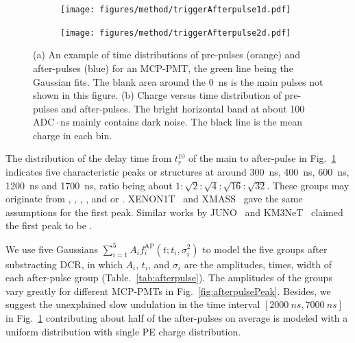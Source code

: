 \begin{figure}[!htbp]
    \centering
    \begin{subfigure}[t]{\LF\textwidth}
        \texttt{[image: figures/method/triggerAfterpulse1d.pdf]}
        \caption{}%
        \label{fig:afterpulse1d}
    \end{subfigure}
    \begin{subfigure}[t]{\LF\textwidth}
        \texttt{[image: figures/method/triggerAfterpulse2d.pdf]}
        \caption{}
        \label{fig:afterpulse2d}
    \end{subfigure}
    \caption{(a) An example of time distributions of pre-pulses (orange) and after-pulses (blue) for an MCP-PMT, the green line being the Gaussian fits. The blank area around the \SI{0}{ns} is the main pulses not shown in this figure. (b) Charge versus time distribution of pre-pulses and after-pulses. The bright horizontal band at about 100\,$\mathrm{ADC}\cdot \mathrm{ns}$ mainly contains dark noise. The black line is the mean charge in each bin.}
\end{figure}

The distribution of the delay time from $t_r^{10}$ of the main to after-pulse in Fig.~\ref{fig:afterpulse1d} indicates five characteristic peaks or structures at around \SI{300}{ns}, \SI{400}{ns}, \SI{600}{ns}, \SI{1200}{ns} and \SI{1700}{ns}, ratio being about $1:\sqrt{2}:\sqrt{4}:\sqrt{16}:\sqrt{32}$. These groups may originate from , , , , and  or . XENON1T~\cite{XENON1TTesting} and XMASS~\cite{Abe_2020} gave the same assumptions for the first peak. Similar works by JUNO~\cite{Zhao:2022gks} and KM3NeT~\cite{KM3NetTesting} claimed the first peak to be .

We use five Gaussians $\sum_{i=1}^{5}{A_if_i^{\mathrm{AP}}(t;t_i,\sigma_i^2)}$ to model the five groups after substracting DCR, in which $A_i$, $t_i$, and $\sigma_i$ are the amplitudes, times, width of each after-pulse group (Table.~\ref{tab:afterpulse}). The amplitudes of the groups vary greatly for different MCP-PMTs in Fig.~\ref{fig:afterpulsePeak}. Besides, we suggest the unexplained slow undulation in the time interval $[\SI{2000}{ns},\SI{7000}{ns}]$ in Fig.~\ref{fig:afterpulse1d} contributing about half of the after-pulses on average is modeled with a uniform distribution with single PE charge distribution.

